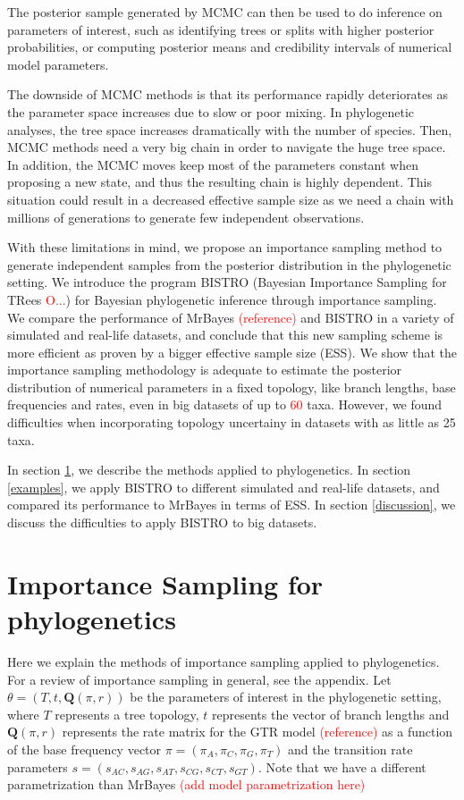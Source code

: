 \documentclass[useAMS,usenatbib]{biom}
\newcommand{\falta}[1]{\textcolor{red}{#1}}
\begin{document}
The posterior sample generated by MCMC can then be used to do
inference on parameters of interest, such as identifying trees or
splits with higher posterior probabilities, or computing posterior
means and credibility intervals of numerical model parameters.

The downside of MCMC methods is that its performance rapidly
deteriorates as the parameter space increases due to slow or poor
mixing. In phylogenetic analyses, the tree space increases
dramatically with the number of species. Then, MCMC methods need a
very big chain in order to navigate the huge tree space. In addition,
the MCMC moves keep most of the parameters constant when proposing a
new state, and thus the resulting chain is highly dependent. This
situation could result in a decreased effective sample size as we need
a chain with millions of generations to generate few independent
observations.

With these limitations in mind, we propose an importance sampling
method to generate independent samples from the posterior distribution
in the phylogenetic setting. We introduce the program BISTRO (Bayesian
Importance Sampling for TRees \falta{O...}) for Bayesian phylogenetic
inference through importance sampling. We compare the performance of
MrBayes \falta{(reference)} and BISTRO in a variety of simulated and
real-life datasets, and conclude that this new sampling scheme is more
efficient as proven by a bigger effective sample size (ESS). We show
that the importance sampling methodology is adequate to estimate the
posterior distribution of numerical parameters in a fixed topology,
like branch lengths, base frequencies and rates, even in big datasets
of up to \falta{60} taxa.  However, we found difficulties when
incorporating topology uncertainy in datasets with as little as 25
taxa.

In section \ref{phyloIS}, we describe the methods applied to
phylogenetics. In section \ref{examples}, we apply BISTRO to different
simulated and real-life datasets, and compared its performance to
MrBayes in terms of ESS. In section \ref{discussion}, we discuss the
difficulties to apply BISTRO to big datasets.



\section[]{Importance Sampling for phylogenetics}
\label{phyloIS}
Here we explain the methods of importance sampling applied to
phylogenetics. For a review of importance sampling in general, see the
appendix.  Let $\theta = (T, t, \mathbf{Q}(\pi,r))$ be the parameters
of interest in the phylogenetic setting, where $T$ represents a tree
topology, $t$ represents the vector of branch lengths and
$\mathbf{Q}(\pi,r)$ represents the rate matrix for the GTR model
\falta{(reference)} as a function of the base frequency vector $\pi =
(\pi_A, \pi_C, \pi_G, \pi_T)$ and the transition rate parameters $s =
(s_{AC}, s_{AG}, s_{AT}, s_{CG}, s_{CT}, s_{GT})$. Note that we have a
different parametrization than MrBayes \falta{(add model
  parametrization here)}
\end{document}
